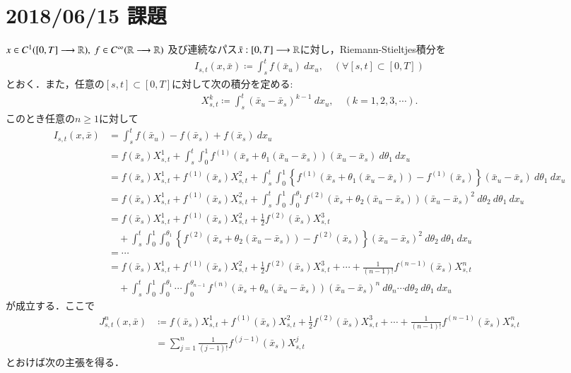 \section{2018/06/15 課題}
	$x \in C^1([0,T] \longrightarrow \mathbb{R}),\ f \in C^\infty(\mathbb{R} \longrightarrow \mathbb{R})$
	及び連続なパス$\bar{x}:[0,T] \longrightarrow \mathbb{R}$に対し，Riemann-Stieltjes積分を
	\begin{align}
		I_{s,t}(x,\bar{x}) \coloneqq \int_s^t f(\bar{x}_u)\ dx_u,
		\quad (\forall [s,t] \subset [0,T])
	\end{align}
	とおく．また，任意の$[s,t] \subset [0,T]$に対して次の積分を定める:
	\begin{align}
		X^k_{s,t} \coloneqq \int_s^t (\bar{x}_u-\bar{x}_s)^{k-1}\ dx_u,
		\quad (k=1,2,3,\cdots).
	\end{align}
	このとき任意の$n \geq 1$に対して
	\begin{align}
		I_{s,t}(x,\bar{x}) 
		&= \int_s^t f(\bar{x}_u) - f(\bar{x}_s) + f(\bar{x}_s)\ dx_u \\
		&= f(\bar{x}_s) X^1_{s,t} + \int_s^t \int_0^1 f^{(1)}(\bar{x}_s + \theta_1(\bar{x}_u - \bar{x}_s))(\bar{x}_u - \bar{x}_s)\ d\theta_1\ dx_u \\
		&= f(\bar{x}_s) X^1_{s,t} + f^{(1)}(\bar{x}_s) X^2_{s,t}
			+ \int_s^t \int_0^1 \left\{f^{(1)}(\bar{x}_s + \theta_1(\bar{x}_u - \bar{x}_s)) - f^{(1)}(\bar{x}_s) \right\}(\bar{x}_u - \bar{x}_s)\ d\theta_1\ dx_u \\
		&= f(\bar{x}_s) X^1_{s,t} + f^{(1)}(\bar{x}_s) X^2_{s,t}
			+ \int_s^t \int_0^1 \int_0^{\theta_1} f^{(2)}(\bar{x}_s + \theta_2(\bar{x}_u - \bar{x}_s))(\bar{x}_u - \bar{x}_s)^2\ d\theta_2\ d\theta_1\ dx_u \\
		&= f(\bar{x}_s) X^1_{s,t} + f^{(1)}(\bar{x}_s) X^2_{s,t} + \frac{1}{2} f^{(2)}(\bar{x}_s) X^3_{s,t} \\
			&\quad + \int_s^t \int_0^1 \int_0^{\theta_1} \left\{ f^{(2)}(\bar{x}_s + \theta_2(\bar{x}_u - \bar{x}_s)) - f^{(2)}(\bar{x}_s) \right\}(\bar{x}_u - \bar{x}_s)^2\ d\theta_2\ d\theta_1\ dx_u \\
		&=\cdots \\
		&= f(\bar{x}_s) X^1_{s,t} + f^{(1)}(\bar{x}_s) X^2_{s,t} + \frac{1}{2} f^{(2)}(\bar{x}_s) X^3_{s,t} + \cdots + \frac{1}{(n-1)!} f^{(n-1)}(\bar{x}_s) X^n_{s,t} \\
			&\quad + \int_s^t \int_0^1 \int_0^{\theta_1} \cdots \int_0^{\theta_{n-1}} f^{(n)}(\bar{x}_s + \theta_n(\bar{x}_u - \bar{x}_s))(\bar{x}_u - \bar{x}_s)^n\ d\theta_n\cdots d\theta_2\ d\theta_1\ dx_u
	\end{align}
	が成立する．ここで
	\begin{align}
		J^n_{s,t}(x,\bar{x}) &\coloneqq f(\bar{x}_s) X^1_{s,t} + f^{(1)}(\bar{x}_s) X^2_{s,t} + \frac{1}{2} f^{(2)}(\bar{x}_s) X^3_{s,t} + \cdots + \frac{1}{(n-1)!} f^{(n-1)}(\bar{x}_s) X^n_{s,t} \\
		&= \sum_{j=1}^n \frac{1}{(j-1)!} f^{(j-1)}(\bar{x}_s) X^j_{s,t}
	\end{align}
	とおけば次の主張を得る．
	
